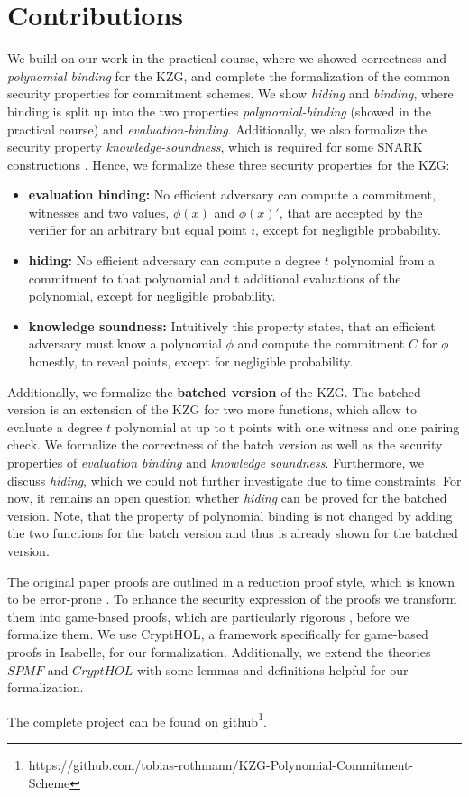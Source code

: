 \section*{Contributions}

We build on our work in the practical course, where we showed correctness and \textit{polynomial binding} for the KZG, and complete the formalization of the common security properties for commitment schemes. We show \textit{hiding} and \textit{binding}, where binding is split up into the two properties \textit{polynomial-binding} (showed in the practical course) and \textit{evaluation-binding}. Additionally, we also formalize the security property \textit{knowledge-soundness}, which is required for some SNARK constructions \parencite*{sonic,plonk}. Hence, we formalize these three security properties  for the KZG:
\begin{itemize}
    \item \textbf{evaluation binding:}
    No efficient adversary can compute a commitment, witnesses and two values, $\phi(x)$ and $\phi(x)'$, that are accepted by the verifier for an arbitrary but equal point $i$, except for negligible probability.
    \item \textbf{hiding:}
    No efficient adversary can compute a degree $t$ polynomial from a commitment to that polynomial and t additional evaluations of the polynomial, except for negligible probability.
    \item \textbf{knowledge soundness:}
    Intuitively this property states, that an efficient adversary must know a polynomial $\phi$ and compute the commitment $C$ for $\phi$ honestly, to reveal points, except for negligible probability. 
\end{itemize} 
Additionally, we formalize the \textbf{batched version} of the KZG\parencite*{KZG}. The batched version is an extension of the KZG for two more functions, which allow to evaluate a degree $t$ polynomial at up to t points with one witness and one pairing check. We formalize the correctness of the batch version as well as the security properties of \textit{evaluation binding} and \textit{knowledge soundness}. Furthermore, we discuss \textit{hiding}, which we could not further investigate due to time constraints. For now, it remains an open question whether \textit{hiding} can be proved for the batched version. Note, that the property of polynomial binding is not changed by adding the two functions for the batch version and thus is already shown for the batched version. 

The original paper proofs are outlined in a reduction proof style, which is known to be error-prone \parencite{gamesB&R}. To enhance the security expression of the proofs we transform them into game-based proofs, which are particularly rigorous \parencite{shoup_games, gamesB&R}, before we formalize them. We use CryptHOL\parencite*{CryptHOL-AFP}, a framework specifically for game-based proofs in Isabelle, for our formalization. 
Additionally, we extend the theories $SPMF$ and $CryptHOL$ with some lemmas and definitions helpful for our formalization.

The complete project can be found on \href{https://github.com/tobias-rothmann/KZG-Polynomial-Commitment-Scheme}{github}\footnote{https://github.com/tobias-rothmann/KZG-Polynomial-Commitment-Scheme}.
